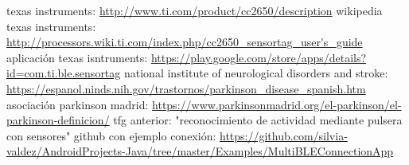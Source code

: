 \documentclass[11pt,spanish]{article}
\begin{document}
\begin{thebibliography}{15}
     texas instruments: \url {http://www.ti.com/product/cc2650/description}
     wikipedia texas instruments: \url {http://processors.wiki.ti.com/index.php/cc2650\_sensortag\_user's\_guide}
     aplicación texas isntruments: \url {https://play.google.com/store/apps/details?id=com.ti.ble.sensortag}
     national institute of neurological disorders and stroke: \url{https://espanol.ninds.nih.gov/trastornos/parkinson_disease_spanish.htm}
     asociación parkinson madrid: \url{https://www.parkinsonmadrid.org/el-parkinson/el-parkinson-definicion/}
     tfg anterior: "reconocimiento de actividad mediante pulsera con sensores"
     github con ejemplo conexión: \url{https://github.com/silvia-valdez/AndroidProjects-Java/tree/master/Examples/MultiBLEConnectionApp}
\end{thebibliography}
\end{document}
